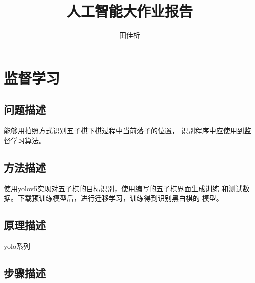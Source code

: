 \documentclass[UTF8]{article}
\title{人工智能大作业报告}
\author{田佳析}
\begin{document}
\maketitle
\tableofcontents

\section{监督学习}
\subsection{问题描述}
能够用拍照方式识别五子棋下棋过程中当前落子的位置，
识别程序中应使用到监督学习算法。
\subsection{方法描述}
使用yolov5实现对五子棋的目标识别，使用编写的五子棋界面生成训练
和测试数据。下载预训练模型后，进行迁移学习，训练得到识别黑白棋的
模型。
\subsection{原理描述}

yolo系列

\subsection{步骤描述}
\end{document}
